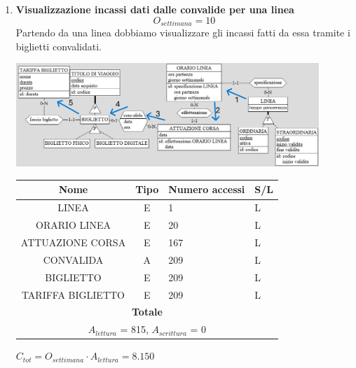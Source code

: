 \documentclass[12pt,a4paper]{report}
\begin{document}
\begin{enumerate}[label=\textbf{\arabic*}]
	\item \textbf{Visualizzazione incassi dati dalle convalide per una linea} \label{op9} \\
    \[ {O_{settimana} = 10} \]
    Partendo da una linea dobbiamo visualizzare gli incassi fatti da essa tramite i biglietti convalidati.
    \begin{center}
	\includegraphics[width=0.9\textwidth]{op_9}
	\end{center}
    \begin{table}[H]
    \centering
    \begin{tabular}{|c|c|l|l|}
    \hline
    \textbf{Nome} & \textbf{Tipo} & \textbf{Numero accessi} & \textbf{S/L} \\
    \hline
    LINEA & E & 1 & L \\
    \hline
    ORARIO LINEA & E & 20 & L \\
    \hline
    ATTUAZIONE CORSA & E & 167 & L \\
    \hline
    CONVALIDA & A & 209 & L \\
    \hline
    BIGLIETTO & E & 209 & L \\
    \hline
    TARIFFA BIGLIETTO & E & 209 & L \\
    \hline
    \multicolumn{4}{c}{\textbf{Totale}} \\
    \multicolumn{4}{c}{${A_{lettura}}$ = 815, ${A_{scrittura}}$ = 0} \\
    \hline
    \end{tabular}
    \end{table}
    \begin{center}
    ${C_{tot} = {O_{settimana}}\cdot {A_{lettura}} = 8.150}$
    \end{center}




\end{enumerate}
\end{document}
